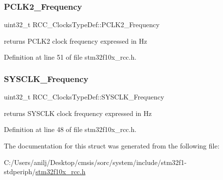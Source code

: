 \subsubsection{\texorpdfstring{P\+C\+L\+K2\+\_\+\+Frequency}{PCLK2\_Frequency}}
{\footnotesize\ttfamily uint32\+\_\+t R\+C\+C\+\_\+\+Clocks\+Type\+Def\+::\+P\+C\+L\+K2\+\_\+\+Frequency}

returns P\+C\+L\+K2 clock frequency expressed in Hz 

Definition at line 51 of file stm32f10x\+\_\+rcc.\+h.

\mbox{\label{struct_r_c_c___clocks_type_def_a2ba325067f3d464ad7955358932563d8}} 
\subsubsection{\texorpdfstring{S\+Y\+S\+C\+L\+K\+\_\+\+Frequency}{SYSCLK\_Frequency}}
{\footnotesize\ttfamily uint32\+\_\+t R\+C\+C\+\_\+\+Clocks\+Type\+Def\+::\+S\+Y\+S\+C\+L\+K\+\_\+\+Frequency}

returns S\+Y\+S\+C\+LK clock frequency expressed in Hz 

Definition at line 48 of file stm32f10x\+\_\+rcc.\+h.



The documentation for this struct was generated from the following file\+:\begin{DoxyCompactItemize}
\item 
C\+:/\+Users/anilj/\+Desktop/cmsis/sorc/system/include/stm32f1-\/stdperiph/\hyperlink{stm32f10x__rcc_8h}{stm32f10x\+\_\+rcc.\+h}\end{DoxyCompactItemize}

